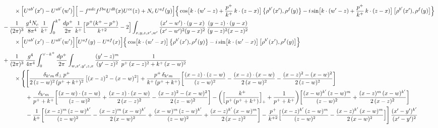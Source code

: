\documentclass[10pt]{article}
\numberwithin{equation}{section}
\begin{document}
\begin{align}
&\qquad\times\Big[U^{ab^{\prime}}(x^{\prime})-U^{ab^{\prime}}(w^{\prime})\Big]\Big[-f^{adc}f^{fbe}U^{db}(x)U^{ce}(z)+N_{c}\,U^{af}(y)\Big]\Big\{\cos\!\big[k\cdot(w^{\prime}-z)+\frac{p^{+}}{k^{+}}\,k\cdot(z-x)\big]\,\big\{\rho^{b^{\prime}}(x^{\prime}),\rho^{f}(y)\big\}-i\sin\!\big[k\cdot(w^{\prime}-z)+\frac{p^{+}}{k^{+}}\,k\cdot(z-x)\big]\,\big[\rho^{b^{\prime}}(x^{\prime}),\rho^{f}(y)\big]\Big\}\notag\\
&-\frac{1}{(2\pi)^{3}}\,\frac{g^{4}N_{c}}{8\pi^{4}}\,\frac{1}{k^{+}}\int_{0}^{k^{+}}\frac{dp^{+}}{2\pi}\,\frac{1}{k^{+}}\Big[\frac{p^{+}(k^{+}-p^{+})}{k^{+2}}-2\Big]\int_{x,y,z,x^{\prime},w^{\prime}}\frac{(x^{\prime}-w^{\prime})\cdot(y-x)}{(x^{\prime}-w^{\prime})^{2}(y-x)^{2}}\,\frac{(y-z)\cdot(y-x)}{(y-z)^{2}(x-z)^{2}}\notag\\&\qquad\times\Big[U^{ab^{\prime}}(x^{\prime})-U^{ab^{\prime}}(w^{\prime})\Big]\Big[U^{af}(y)-U^{af}(x)\Big]\Big\{\cos\!\big[k\cdot(w^{\prime}-x)\big]\,\big\{\rho^{b^{\prime}}(x^{\prime}),\rho^{f}(y)\big\}-i\sin\!\big[k\cdot(w^{\prime}-x)\big]\,\big[\rho^{b^{\prime}}(x^{\prime}),\rho^{f}(y)\big]\Big\}\notag\\[4pt]
&+\frac{1}{(2\pi)^{3}}\,\frac{g^{4}}{4\pi^{4}}\int_{0}^{\vee-k^{+}}\frac{dp^{+}}{2\pi}\int_{w,x^{\prime},y^{\prime},z,x}\frac{(y^{\prime}-z)^{m}}{(y^{\prime}-z)^{2}}\,\frac{1}{p^{+}\,(x-z)^{2}+k^{+}\,(x-w)^{2}}\notag\\
&\qquad\times\Bigg\{\Bigg[\frac{\delta_{k^{\prime}m}\,d_{\perp}\,p^{+}}{2\,(z-w)^{2}\,(p^{+}+k^{+})^{2}}\left[(x-z)^{2}-(x-w)^{2}\right]+\frac{p^{+}\,\delta_{k^{\prime}m}}{k^{+}\,(p^{+}+k^{+})}\bigg[\frac{(x-z)\cdot(z-w)}{(z-w)^{2}}-\frac{(x-z)\cdot(x-w)}{2\,(x-w)^{2}}-\frac{(x-z)^{2}-(x-w)^{2}}{2\,(z-w)^{2}}\bigg]\notag\\
&\qquad\qquad+\frac{\delta_{k^{\prime}m}}{p^{+}+k^{+}}\bigg[\frac{(x-w)\cdot(z-w)}{(z-w)^{2}}+\frac{(x-z)\cdot(x-w)}{2\,(x-z)^{2}}-\frac{(x-z)^{2}-(x-w)^{2}}{2\,(z-w)^{2}}\bigg]
-\bigg(\Big[\frac{k^{+}}{p^{+}\,(p^{+}+k^{+})}\Big]_{+}+\frac{1}{p^{+}+k^{+}}\bigg)\bigg[\frac{(x-w)^{k^{\prime}}\,(z-w)^{m}}{(z-w)^{2}}+\frac{(x-z)^{m}\,(x-w)^{k^{\prime}}}{2\,(x-z)^{2}}\bigg]\notag\\
&\qquad\qquad-\frac{1}{k^{+}}\bigg[\frac{(x-z)^{m}\,(z-w)^{k^{\prime}}}{(z-w)^{2}}-\frac{(x-z)^{m}\,(x-w)^{k^{\prime}}}{2\,(x-w)^{2}}+\frac{(x-w)^{m}\,(z-w)^{k^{\prime}}}{(z-w)^{2}}+\frac{(x-z)^{k^{\prime}}\,(x-w)^{m}}{2\,(x-z)^{2}}\bigg]
-\frac{p^{+}}{k^{+2}}\Big[\frac{(x-z)^{k^{\prime}}\,(z-w)^{m}}{(z-w)^{2}}-\frac{(x-z)^{k^{\prime}}\,(x-w)^{m}}{2\,(x-w)^{2}}\Big]\Bigg]\,\frac{(x^{\prime}-y^{\prime})^{k^{\prime}}}{(x^{\prime}-y^{\prime})^{2}}\notag\\

\end{align}
\end{document}
